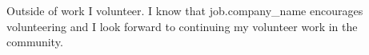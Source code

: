 Outside of work I volunteer. I know that {{job.company_name}} encourages volunteering and I look forward to continuing my volunteer work in the community.

